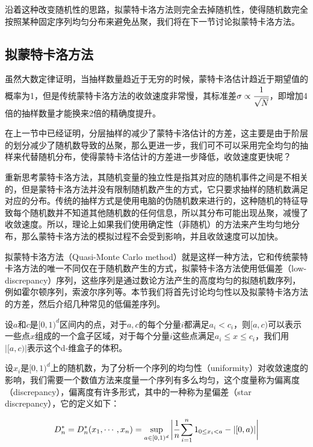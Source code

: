 沿着这种改变随机性的思路，拟蒙特卡洛方法则完全去掉随机性，使得随机数完全按照某种固定序列均匀分布来避免丛聚，我们将在下一节讨论拟蒙特卡洛方法。





\subsection{拟蒙特卡洛方法}\label{sec:quasi-monte-carlo}
虽然大数定律证明，当抽样数量趋近于无穷的时候，蒙特卡洛估计趋近于期望值的概率为1，但是传统蒙特卡洛方法的收敛速度非常慢，其标准差$\sigma\propto \cfrac{1}{\sqrt{N}}$，即增加4倍的抽样数量才能换来2倍的精确度提升。

在上一节中已经证明，分层抽样的减少了蒙特卡洛估计的方差，这主要是由于阶层的划分减少了随机数导致的丛聚，那么更进一步，我们可不可以采用完全均匀的抽样来代替随机分布，使得蒙特卡洛估计的方差进一步降低，收敛速度更快呢？

重新思考蒙特卡洛方法，其随机变量的独立性是指其对应的随机事件之间是不相关的，但是蒙特卡洛方法并没有限制随机数产生的方式，它只要求抽样的随机数满足对应的分布。传统的抽样方式是使用电脑的伪随机数来进行的，这种随机的特征导致每个随机数并不知道其他随机数的任何信息，所以其分布可能出现丛聚，减慢了收敛速度。所以，理论上如果我们使用确定性（非随机）的方法来产生均匀地分布，那么蒙特卡洛方法的模拟过程不会受到影响，并且收敛速度可以加快。

拟蒙特卡洛方法（Quasi-Monte Carlo method）就是这样一种方法，它和传统蒙特卡洛方法的唯一不同仅在于随机数产生的方式，拟蒙特卡洛方法使用低偏差（low-discrepancy）序列，这些序列是通过数论方法产生的高度均匀的拟随机数序列，例如霍尔顿序列，索波尔序列等。本节我们将首先讨论均匀性以及拟蒙特卡洛方法的方差，然后介绍几种常见的低偏差序列。

设$a$和$c$是$[0,1)^d$区间内的点，对于$a,c$的每个分量$i$都满足$a_i<c_i$，则$[a,c)$可以表示一些点$x$组成的一个盒子区域，对于每个分量$i$这些点满足$a_i\leq x\leq c_i$，我们用$|[a,c)|$表示这个d-维盒子的体积。

设$x_i$是$[0,1)^d$上的随机数，为了分析一个序列的均匀性（uniformity）对收敛速度的影响，我们需要一个数值方法来度量一个序列有多么均匀，这个度量称为偏离度（discrepancy），偏离度有许多形式，其中的一种称为星偏差（star discrepancy），它的定义如下：

\begin{equation}
	D^{*}_n=D^{*}_n(x_1,\cdots,x_n)=\sup_{a\in[0,1)^d}\bigg| \cfrac{1}{n}\sum^{n}_{i=1}1_{0\leq x_i<a}-|[0,a)|\bigg|
\end{equation}

